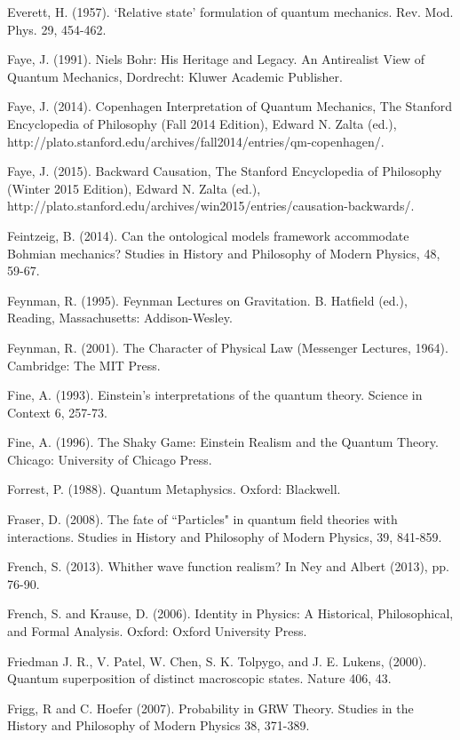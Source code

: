 \begin{thebibliography}{}
\bibitem{} Everett, H. (1957). `Relative state' formulation of quantum mechanics. Rev. Mod. Phys. 29, 454-462.

\bibitem{}  Faye, J. (1991). Niels Bohr: His Heritage and Legacy. An Antirealist View of Quantum Mechanics, Dordrecht: Kluwer Academic Publisher.

\bibitem{} Faye, J. (2014). Copenhagen Interpretation of Quantum Mechanics, The Stanford Encyclopedia of Philosophy (Fall 2014 Edition), Edward N. Zalta (ed.), http://plato.stanford.edu/archives/fall2014/entries/qm-copenhagen/.

\bibitem{} Faye, J. (2015). Backward Causation, The Stanford Encyclopedia of Philosophy (Winter 2015 Edition), Edward N. Zalta (ed.), http://plato.stanford.edu/archives/win2015/entries/causation-backwards/.

\bibitem{} Feintzeig, B. (2014). Can the ontological models framework accommodate Bohmian mechanics? Studies in History and Philosophy of Modern Physics, 48, 59-67.

\bibitem{} Feynman, R. (1995). Feynman Lectures on Gravitation. B. Hatfield (ed.), Reading, Massachusetts:  Addison-Wesley.

\bibitem{} Feynman, R. (2001). The Character of Physical Law (Messenger Lectures, 1964). Cambridge: The MIT Press.

\bibitem{} Fine, A. (1993). Einstein's interpretations of the quantum theory. Science in Context 6, 257-73.

\bibitem{} Fine, A. (1996). The Shaky Game: Einstein Realism and the Quantum Theory. Chicago:
University of Chicago Press.

\bibitem{} Forrest, P. (1988). Quantum Metaphysics. Oxford: Blackwell.

\bibitem{} Fraser, D. (2008). The fate of ``Particles" in quantum field theories with interactions. Studies in History and Philosophy of Modern Physics, 39, 841-859.

\bibitem{} French, S. (2013). Whither wave function realism? In Ney and Albert (2013), pp. 76-90.

\bibitem{} French, S. and Krause, D. (2006). Identity in Physics: A Historical, Philosophical, and Formal Analysis. Oxford: Oxford University Press.


\bibitem{} Friedman J. R., V. Patel, W. Chen, S. K. Tolpygo,  and J. E. Lukens,  (2000). Quantum superposition of distinct macroscopic states. Nature 406, 43.

\bibitem{} Frigg, R and C. Hoefer  (2007). Probability in GRW Theory. Studies in the History and Philosophy of Modern Physics 38, 371-389.


\end{thebibliography}
